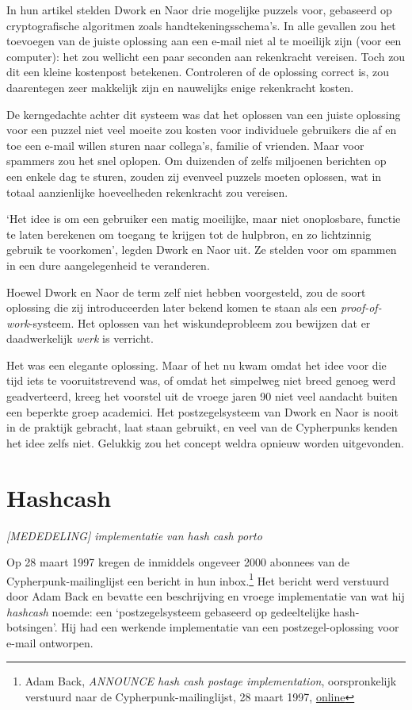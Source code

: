 \documentclass[
  a5paper,
  smalldemyvopaper,11pt,twoside,onecolumn,openright,extrafontsizes,
hidelinks]{memoir}
\begin{document}
In hun artikel stelden Dwork en Naor drie mogelijke puzzels voor,
gebaseerd op cryptografische algoritmen zoals handtekeningsschema's. In
alle gevallen zou het toevoegen van de juiste oplossing aan een e-mail
niet al te moeilijk zijn (voor een computer): het zou wellicht een paar
seconden aan rekenkracht vereisen. Toch zou dit een kleine kostenpost
betekenen. Controleren of de oplossing correct is, zou daarentegen zeer
makkelijk zijn en nauwelijks enige rekenkracht kosten.

De kerngedachte achter dit systeem was dat het oplossen van een juiste
oplossing voor een puzzel niet veel moeite zou kosten voor individuele
gebruikers die af en toe een e-mail willen sturen naar collega's,
familie of vrienden. Maar voor spammers zou het snel oplopen. Om
duizenden of zelfs miljoenen berichten op een enkele dag te sturen,
zouden zij evenveel puzzels moeten oplossen, wat in totaal aanzienlijke
hoeveelheden rekenkracht zou vereisen.

`Het idee is om een gebruiker een matig moeilijke, maar niet
onoplosbare, functie te laten berekenen om toegang te krijgen tot de
hulpbron, en zo lichtzinnig gebruik te voorkomen', legden Dwork en Naor
uit. Ze stelden voor om spammen in een dure aangelegenheid te
veranderen.

Hoewel Dwork en Naor de term zelf niet hebben voorgesteld, zou de soort
oplossing die zij introduceerden later bekend komen te staan als een
\emph{proof-of-work}-systeem. Het oplossen van het wiskundeprobleem zou
bewijzen dat er daadwerkelijk \emph{werk} is verricht.

Het was een elegante oplossing. Maar of het nu kwam omdat het idee voor
die tijd iets te vooruitstrevend was, of omdat het simpelweg niet breed
genoeg werd geadverteerd, kreeg het voorstel uit de vroege jaren 90 niet
veel aandacht buiten een beperkte groep academici. Het postzegelsysteem
van Dwork en Naor is nooit in de praktijk gebracht, laat staan gebruikt,
en veel van de Cypherpunks kenden het idee zelfs niet. Gelukkig zou het
concept weldra opnieuw worden uitgevonden.

\section{Hashcash}\label{hashcash-1}

\emph{{[}MEDEDELING{]} implementatie van hash cash porto}

Op 28 maart 1997 kregen de inmiddels ongeveer 2000 abonnees van de
Cypherpunk-mailinglijst een bericht in hun inbox.\footnote{Adam Back,
  \emph{ANNOUNCE hash cash postage implementation}, oorspronkelijk
  verstuurd naar de Cypherpunk-mailinglijst, 28 maart 1997,
  \href{https://cypherpunks.venona.com/date/1997/03/msg00774.html}{online}}
Het bericht werd verstuurd door Adam Back en bevatte een beschrijving en
vroege implementatie van wat hij \emph{hashcash} noemde: een
`postzegelsysteem gebaseerd op gedeeltelijke hash-botsingen'. Hij had
een werkende implementatie van een postzegel-oplossing voor e-mail
ontworpen.
\end{document}
